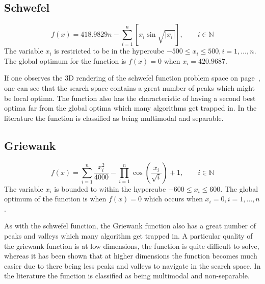 \subsection{Schwefel}
\begin{equation}
	f(x) = 418.9829n - \sum^n_{i=1} [x_i\sin{\sqrt{|x_i|}}], \qquad i \in \mathbb{N}
\end{equation}
The variable $x_i$ is restricted to be in the hypercube $-500 \leq x_i \leq 500, i = 1,\ldots,n$\cite{ABCCompareStudy,numericalABC,HybridIntelliGA,DistributedHierarchicalGA,TestFunctions}. The global optimum for the function is $f(x) = 0$ when $x_i = 420.9687$\cite{ABCCompareStudy,numericalABC,HybridIntelliGA,DistributedHierarchicalGA,TestFunctions}. 

If one observes the 3D rendering of the schwefel function problem space on page~\pageref{fig:SchwefelGraph}, one can see that the search space contains a great number of peaks which might be local optima. The function also has the characteristic of having a second best optima far from the global optima which many algorithms get trapped in\cite{ABCCompareStudy,numericalABC,HybridIntelliGA,DistributedHierarchicalGA,TestFunctions}. In the literature the function is classified as being multimodal and separable\cite{ABCCompareStudy,numericalABC,HybridIntelliGA,TestFunctions}.
\subsection{Griewank}
\begin{equation}
	f(x) = \sum^n_{i=1} \frac{x^2_i}{4000} - \prod^n_{i=1}\cos{(\frac{x_i}{\sqrt{i}})} + 1, \qquad i \in \mathbb{N}
\end{equation}
The variable $x_i$ is bounded to within the hypercube $ -600 \leq x_i \leq 600 $\cite{numericalABC,ABCCompareStudy,ARPSO,PerfABC,ContinACSTS,TestFunctions}. The global optimum of the function is when $f(x) =0$ which occurs when $ x_i = 0, i = 1, \dots, n $\cite{numericalABC,ABCCompareStudy,ARPSO,PerfABC,ContinACSTS,TestFunctions}.

As with the schwefel function, the Griewank function also has a great number of peaks and valleys which many algorithm get trapped in. A particular quality of the griewank function is at low dimensions, the function is quite difficult to solve, whereas it has been shown that at higher dimensions the function becomes much easier due to there being less peaks and valleys to navigate in the search space\cite{evalevoalgo,ABCCompareStudy,numericalABC,PerfABC,TestFunctions}. In the literature the function is classified as being multimodal and non-separable\cite{adaptPSO,ABCCompareStudy,numericalABC,ChaoticABC,PerfABC,TestFunctions}.
